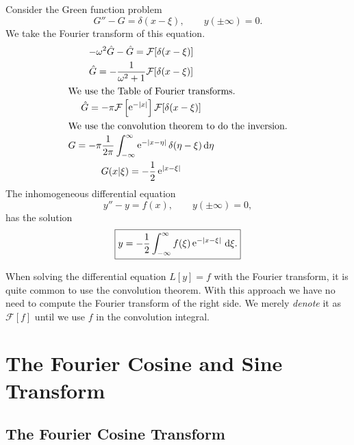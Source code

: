 \begin{Example}
  Consider the Green function problem
  \[ 
  G'' - G = \delta(x-\xi), \qquad y(\pm \infty) = 0.
  \]
  We take the Fourier transform of this equation.
  \begin{gather*}
    -\omega^2 \hat{G} - \hat{G} = \mathcal{F}[ \delta(x - \xi) ]
    \\
    \hat{G} = - \frac{1}{\omega^2 + 1} \mathcal{F}[ \delta(x - \xi) ]
    \\
    \intertext{We use the Table of Fourier transforms.}
    \hat{G} = - \pi \mathcal{F}\left[ \mathop{\mathrm{e}}\nolimits^{-|x|} \right] \mathcal{F}[ \delta(x - \xi) ]
    \\
    \intertext{We use the convolution theorem to do the inversion.}
    G = - \pi \frac{1}{2 \pi} \int_{-\infty}^\infty \mathop{\mathrm{e}}\nolimits^{-|x - \eta|} \delta(\eta - \xi) \,\mathrm{d} \eta
    \\
    G(x|\xi) = - \frac{1}{2} \mathop{\mathrm{e}}\nolimits^{|x - \xi|}
  \end{gather*}
  The inhomogeneous differential equation
  \[ 
  y'' - y = f(x), \qquad y(\pm \infty) = 0,
  \]
  has the solution
  \[ 
  \boxed{ 
    y = - \frac{1}{2} \int_{-\infty}^\infty f(\xi) \mathop{\mathrm{e}}\nolimits^{-|x-\xi|}\,\mathrm{d} \xi. 
    } 
  \]
\end{Example}







When solving the differential equation $L[y] = f$ with the Fourier transform, 
it is quite common to use the convolution theorem.  With this approach we 
have no need to compute the Fourier transform of the right side.  We merely
\textit{denote} it as $\mathcal{F}[f]$ until we use $f$ in the convolution
integral.














\section{The Fourier Cosine and Sine Transform}






\subsection{The Fourier Cosine Transform}





